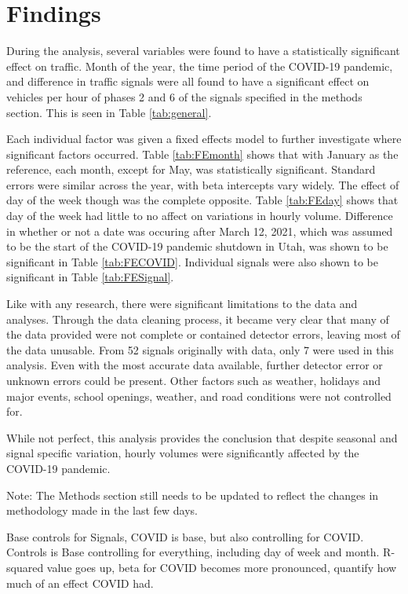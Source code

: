 \documentclass[3p, authoryear]{elsarticle} %
\begin{document}
\hypertarget{findings}{%
\section{Findings}\label{findings}}

During the analysis, several variables were found to have a statistically significant effect on traffic. Month of the year, the time period of the COVID-19 pandemic, and difference in traffic signals were all found to have a significant effect on vehicles per hour of phases 2 and 6 of the signals specified in the methods section. This is seen in Table \ref{tab:general}.

Each individual factor was given a fixed effects model to further investigate where significant factors occurred. Table \ref{tab:FEmonth} shows that with January as the reference, each month, except for May, was statistically significant. Standard errors were similar across the year, with beta intercepts vary widely. The effect of day of the week though was the complete opposite. Table \ref{tab:FEday} shows that day of the week had little to no affect on variations in hourly volume. Difference in whether or not a date was occuring after March 12, 2021, which was assumed to be the start of the COVID-19 pandemic shutdown in Utah, was shown to be significant in Table \ref{tab:FECOVID}. Individual signals were also shown to be significant in Table \ref{tab:FESignal}.

Like with any research, there were significant limitations to the data and analyses. Through the data cleaning process, it became very clear that many of the data provided were not complete or contained detector errors, leaving most of the data unusable. From 52 signals originally with data, only 7 were used in this analysis. Even with the most accurate data available, further detector error or unknown errors could be present. Other factors such as weather, holidays and major events, school openings, weather, and road conditions were not controlled for.

While not perfect, this analysis provides the conclusion that despite seasonal and signal specific variation, hourly volumes were significantly affected by the COVID-19 pandemic.

Note: The Methods section still needs to be updated to reflect the changes in methodology made in the last few days.

Base controls for Signals, COVID is base, but also controlling for COVID. Controls is Base controlling for everything, including day of week and month. R-squared value goes up, beta for COVID becomes more pronounced, quantify how much of an effect COVID had.
\end{document}
